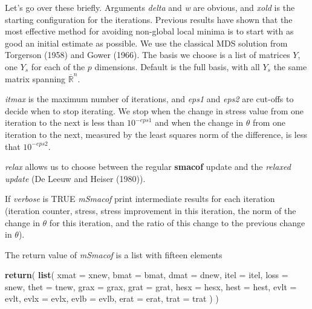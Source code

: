 \documentclass[
  12pt,
]{article}
\newenvironment{Shaded}{\begin{snugshade}}{\end{snugshade}}
\newcommand{\AttributeTok}[1]{\textcolor[rgb]{0.13,0.29,0.53}{#1}}
\newcommand{\FunctionTok}[1]{\textcolor[rgb]{0.13,0.29,0.53}{\textbf{#1}}}
\newcommand{\NormalTok}[1]{#1}
\begin{document}
Let's go over these briefly. Arguments \emph{delta} and \emph{w} are obvious, and \emph{xold}
is the starting configuration for the iterations. Previous results have shown
that the most effective method for avoiding non-global local minima is to start
with as good an initial estimate as possible. We use the classical MDS solution
from Torgerson (1958) and Gower (1966). The basis we choose is a list of matrices
\(Y\), one \(Y_s\) for each of the \(p\) dimensions. Default is the full basis, with all \(Y_s\) the same matrix spanning \(\overline{\mathbb{R}}^n\).

\emph{itmax} is the maximum number of iterations, and \emph{eps1} and \emph{eps2} are
cut-offs to decide when to stop iterating. We stop when the
change in stress value from one iteration to the next is less than
\(10^{-eps1}\) and when the change in \(\theta\) from one iteration to the next,
measured by the least squares norm of the difference, is less that \(10^{-eps2}\).

\emph{relax} allows us to choose between the regular \textbf{smacof} update and the
\emph{relaxed update} (De Leeuw and Heiser (1980)).

If \emph{verbose} is TRUE \emph{mSmacof} print intermediate results for each iteration
(iteration counter, stress, stress improvement in this iteration, the norm of the change in \(\theta\) for this iteration, and the ratio of this change to the previous change in \(\theta\)).

The return value of \emph{mSmacof} is a list with fifteen elements

\begin{Shaded}
\begin{Highlighting}[]
    \FunctionTok{return}\NormalTok{(}
      \FunctionTok{list}\NormalTok{(}
        \AttributeTok{xmat =}\NormalTok{ xnew,}
        \AttributeTok{bmat =}\NormalTok{ bmat,}
        \AttributeTok{dmat =}\NormalTok{ dnew,}
        \AttributeTok{itel =}\NormalTok{ itel,}
        \AttributeTok{loss =}\NormalTok{ snew,}
        \AttributeTok{thet =}\NormalTok{ tnew,}
        \AttributeTok{grax =}\NormalTok{ grax,}
        \AttributeTok{grat =}\NormalTok{ grat,}
        \AttributeTok{hesx =}\NormalTok{ hesx,}
        \AttributeTok{hest =}\NormalTok{ hest,}
        \AttributeTok{evlt =}\NormalTok{ evlt,}
        \AttributeTok{evlx =}\NormalTok{ evlx,}
        \AttributeTok{evlb =}\NormalTok{ evlb,}
        \AttributeTok{erat =}\NormalTok{ erat,}
        \AttributeTok{trat =}\NormalTok{ trat}
\NormalTok{      )}
\NormalTok{    )}
\end{Highlighting}
\end{Shaded}
\end{document}
